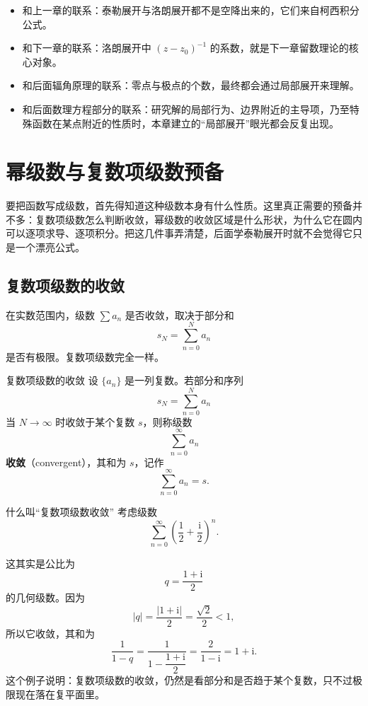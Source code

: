 \begin{tishi}[与前后章节的联系]
\begin{itemize}
    \item 和上一章的联系：泰勒展开与洛朗展开都不是空降出来的，它们来自柯西积分公式。
    \item 和下一章的联系：洛朗展开中 $(z-z_0)^{-1}$ 的系数，就是下一章留数理论的核心对象。
    \item 和后面辐角原理的联系：零点与极点的个数，最终都会通过局部展开来理解。
    \item 和后面数理方程部分的联系：研究解的局部行为、边界附近的主导项，乃至特殊函数在某点附近的性质时，本章建立的``局部展开''眼光都会反复出现。
\end{itemize}
\end{tishi}

\section{幂级数与复数项级数预备}

\begin{wulibj}[为什么先讲这一节]
要把函数写成级数，首先得知道这种级数本身有什么性质。这里真正需要的预备并不多：复数项级数怎么判断收敛，幂级数的收敛区域是什么形状，为什么它在圆内可以逐项求导、逐项积分。把这几件事弄清楚，后面学泰勒展开时就不会觉得它只是一个漂亮公式。
\end{wulibj}

\subsection{复数项级数的收敛}

在实数范围内，级数 $\sum a_n$ 是否收敛，取决于部分和
\[
    s_N = \sum_{n=0}^{N} a_n
\]
是否有极限。复数项级数完全一样。

\begin{dingliyi}{复数项级数的收敛}{}
设 $\{a_n\}$ 是一列复数。若部分和序列
\[
    s_N = \sum_{n=0}^{N} a_n
\]
当 $N \to \infty$ 时收敛于某个复数 $s$，则称级数
\[
    \sum_{n=0}^{\infty} a_n
\]
\textbf{收敛}（convergent），其和为 $s$，记作
\[
    \sum_{n=0}^{\infty} a_n = s.
\]
\end{dingliyi}

\begin{lizi}{什么叫``复数项级数收敛''}{}
考虑级数
\[
    \sum_{n=0}^{\infty}\left(\frac{1}{2}+\frac{\mathrm{i}}{2}\right)^n.
\]

\begin{jie}
这其实是公比为
\[
    q=\frac{1+\mathrm{i}}{2}
\]
的几何级数。因为
\[
    |q|=\frac{|1+\mathrm{i}|}{2}=\frac{\sqrt{2}}{2}<1,
\]
所以它收敛，其和为
\[
    \frac{1}{1-q}
    = \frac{1}{1-\dfrac{1+\mathrm{i}}{2}}
    = \frac{2}{1-\mathrm{i}}
    = 1+\mathrm{i}.
\]
这个例子说明：复数项级数的收敛，仍然是看部分和是否趋于某个复数，只不过极限现在落在复平面里。
\end{jie}
\end{lizi}

